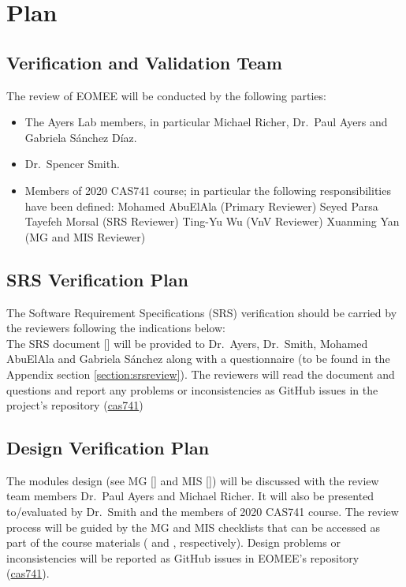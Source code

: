 \documentclass[12pt, titlepage]{article}
\begin{document}
\section{Plan}
\label{section:plans}

\subsection{Verification and Validation Team}

The review of EOMEE will be conducted by the following parties:
\begin{itemize}
	\item The Ayers Lab members, in particular Michael Richer, Dr.\ Paul Ayers 
	and Gabriela S\'anchez D\'iaz.
	\item Dr.\ Spencer Smith.
	\item Members of 2020 CAS741 course; in particular the following 
	responsibilities have been defined:
	\subitem Mohamed AbuElAla (Primary Reviewer)
	\subitem Seyed Parsa Tayefeh Morsal (SRS Reviewer)
	\subitem Ting-Yu Wu (VnV Reviewer)
	\subitem Xuanming Yan (MG and MIS Reviewer)
\end{itemize}

\subsection{SRS Verification Plan}

The Software Requirement Specifications (SRS) verification should be carried by 
the reviewers following the indications below:\\
The SRS document [\cite{SRS2020}] will be provided to Dr.\ Ayers, Dr.\ 
Smith, Mohamed AbuElAla and Gabriela S\'anchez along with a questionnaire (to 
be found in the Appendix section \ref{section:srsreview}). The reviewers 
will read the document and questions and report any problems or 
inconsistencies as GitHub issues in the project's repository 
(\href{https://github.com/gabrielasd/eomee/tree/cas741} 
{cas741})

\subsection{Design Verification Plan}

The modules design (see MG [\cite{MG2020}] and MIS [\cite{MIS2020}]) will be 
discussed with the review team members Dr.\ Paul Ayers and Michael Richer. It 
will also be presented to/evaluated by Dr.\ Smith and the members of 2020 
CAS741 course. The review process will be guided by the MG and MIS checklists  
that can be accessed as part of the course materials (\cite{mgcheck} and 
\cite{mischeck}, respectively). Design problems or inconsistencies will be 
reported as GitHub issues in EOMEE's repository 
(\href{https://github.com/gabrielasd/eomee/tree/cas741}{cas741}).
\end{document}
